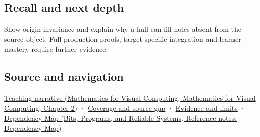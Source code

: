 \subsection{Recall and next depth}\label{appendix-0026ec42c9d5-recall-and-next-depth}

Show origin invariance and explain why a hull can fill holes absent from the source object. Full production proofs, target-specific integration and learner mastery require further evidence.

\subsection{Source and navigation}\label{appendix-0026ec42c9d5-source-and-navigation}

\href{../02-Mathematics-for-Visual-Computing/main.pdf\#nameddest=01-foundations-i-ch018-weighted-points-lead-from-affine-geometry-to-collision-shapes}{Teaching narrative (Mathematics for Visual Computing, Mathematics for Visual Computing, Chapter 2)} · \hyperref[appendix-fd090d982a15-phase-6---parts-501-600]{Coverage and source gap} · \hyperref[appendix-a103e7846d21-phase-6---source-analysis-and-verification]{Evidence and limits} · \href{../01-Bits-Programs-and-Reliable-Systems/main.pdf\#nameddest=appendix-4ad47bdd269a}{Dependency Map (Bits, Programs, and Reliable Systems, Reference notes: Dependency Map)}
